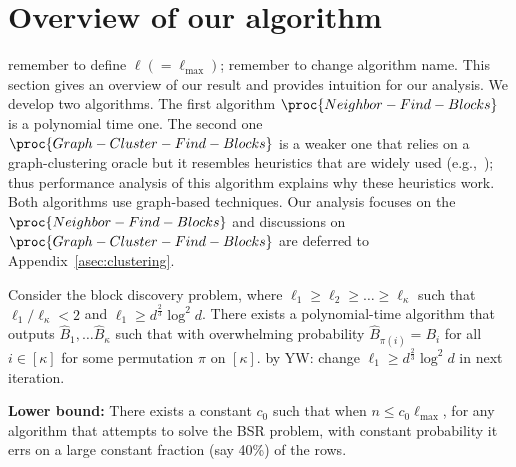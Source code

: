 \section{Overview of our algorithm}
{\color{red} remember to define $\ell (= \ell_{\max})$; remember to change algorithm name.}
This section gives an overview of our result and provides intuition for our analysis. We develop two algorithms. The first algorithm $\proc{Neighbor-Find-Blocks}$ is a polynomial time one. The second one $\proc{Graph-Cluster-Find-Blocks}$ is a weaker one that relies on a graph-clustering oracle but it resembles heuristics that are widely used (e.g.,~\cite{ari2002clustered,jacob2009clustered,huang2012learning}); thus performance analysis of this algorithm explains why these heuristics work.  Both algorithms use graph-based techniques. Our analysis focuses on the $\proc{Neighbor-Find-Blocks}$ and discussions on $\proc{Graph-Cluster-Find-Blocks}$ are deferred to Appendix~\ref{asec:clustering}.


\begin{theorem}\label{thm:main} Consider the block discovery problem,  where $\ell_1 \geq \ell_2 \geq \dots \geq \ell_{\kappa}$ such that $\ell_1 / \ell_{\kappa} < 2$ and $\ell_1 \geq d^{\frac 2 3} \log^2d$. There exists a polynomial-time algorithm that outputs $\hat B_1, \dots \hat B_{\kappa}$ such that 
with overwhelming probability  $\hat B_{\pi(i)} = B_i$ for all $i \in [\kappa]$ for some  permutation $\pi$ on $[\kappa]$.
{\color{red}by YW: change $\ell_1 \geq d^{\frac 2 3} \log^2d$ in next iteration.}



\textbf{Lower bound:}
 There exists a constant $c_0$ such that when $n \leq c_0 \ell_{\max}$,  for any algorithm that attempts to solve the BSR problem, with constant probability it errs on a large constant fraction (say 40\%) of the rows.
\end{theorem}


